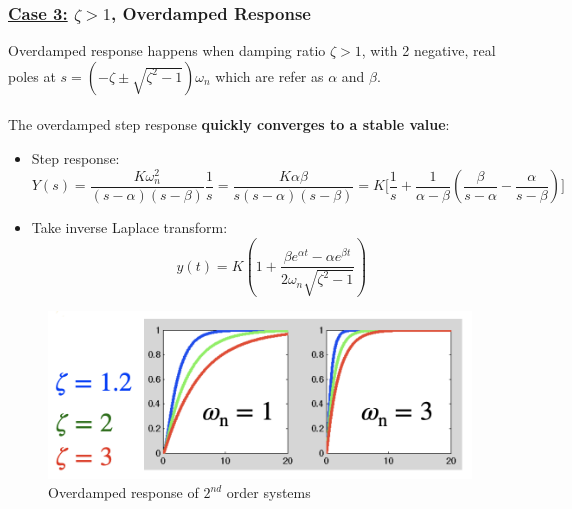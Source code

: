 \documentclass[12pt,a4paper]{article}
\begin{document}
\subsubsection{\underline{Case 3:} $\zeta>1$, Overdamped Response}
Overdamped response happens when damping ratio $\zeta>1$, with 2 negative, real poles at $s = (-\zeta\pm \sqrt{\zeta^{2}-1})\omega_{n}$ which are refer as $\alpha$ and $\beta$.\\\\
The overdamped step response \textbf{quickly converges to a stable value}:
\begin{itemize}
\item Step response:
\[Y(s) = \frac{K\omega_{n}^{2}}{(s-\alpha)(s-\beta)} \frac{1}{s} = \frac{K\alpha\beta}{s(s-\alpha)(s-\beta)} = K\bigg[ \frac{1}{s}+\frac{1}{\alpha-\beta}(\frac{\beta}{s-\alpha}-\frac{\alpha}{s-\beta})\bigg]\]
\item Take inverse Laplace transform:
\[y(t) = K(1+\frac{\beta e^{\alpha t}-\alpha e^{\beta t}}{2\omega_{n}\sqrt{\zeta^{2}-1}})\]
\end{itemize}
\begin{figure}[H] \centering 
\includegraphics[width=.6\textwidth]{images/case3.png}
\caption{Overdamped response of $2^{nd}$ order systems}
\end{figure}
\end{document}
